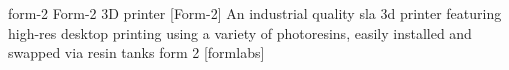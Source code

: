 \newglsXequipment%
{form-2}%
{Form{\--}2 3D printer}%
[Form{\--}2]%
{An industrial quality \gls{sla} \gls{3d} printer featuring \gls{high-res} desktop printing using a variety of photoresins, easily installed and swapped via resin tanks}%
{form 2}%
[formlabs]%